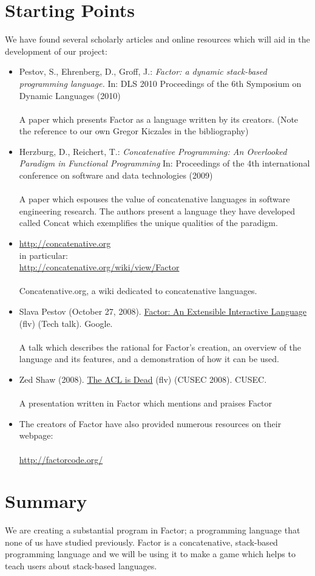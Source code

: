 \documentclass{sig-alternate}
\begin{document}
\section{Starting Points}
We have found several scholarly articles and online resources
which will aid in the development of our project:

\begin{itemize}
\item Pestov, S., Ehrenberg, D., Groff, J.: \textit{Factor: a dynamic stack-based programming
language.} In: DLS 2010 Proceedings of the 6th Symposium on Dynamic Languages
(2010)\\\\A paper which presents Factor as a language written by its creators. (Note the
reference to our own Gregor Kiczales in the bibliography)
\item Herzburg, D., Reichert, T.: \textit{Concatenative Programming:
An Overlooked Paradigm in Functional Programming} In: Proceedings of the 4th
international conference on software and data technologies (2009)
\\\\A paper which espouses the value of concatenative languages in software engineering 
research. The authors present a language they have developed called Concat which exemplifies the unique qualities of the paradigm.
\item \url{http://concatenative.org}\\
in particular:\\\url{http://concatenative.org/wiki/view/Factor}\\\\Concatenative.org, a wiki dedicated to concatenative languages.
\item Slava Pestov (October 27, 2008). \href{http://youtu.be/f_0QlhYlS8g}{Factor: An Extensible Interactive Language} (flv) (Tech talk). Google.\\\\A talk which describes the rational for Factor's creation, an overview of the language and its features, and a demonstration of how it can be used.
\item Zed Shaw (2008). \href{http://vimeo.com/2723800}{The ACL is Dead} (flv) (CUSEC 2008). CUSEC.\\\\
A presentation written in Factor which mentions and praises Factor
\item The creators of Factor have also provided numerous resources on their webpage:\\\\\url{http://factorcode.org/}
\end{itemize}


\section{Summary}
We are creating a substantial program in Factor; a programming language that none of us have studied previously. Factor is a concatenative, stack-based programming language and we will be using it to make a game which helps to teach users about stack-based languages.


\theendnotes

\balancecolumns
\end{document}
